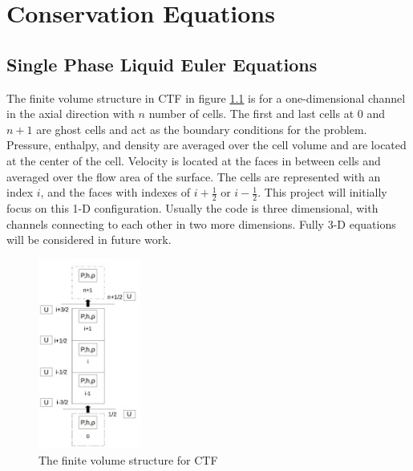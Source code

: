 \vspace*{-80mm}
\chapter{Conservation Equations} \label{chapter2:conservation_equations}
	
	
\section{Single Phase Liquid Euler Equations} \label{sec:euler_equations}
	
	The finite volume structure in CTF in figure \ref{fig:CTF-Cells} is for
	a one-dimensional channel in the axial direction with $n$ number of cells.
	The first and last cells at $0$ and $n+1$ are ghost cells and act as the
	boundary conditions for the problem. Pressure, enthalpy, and density are
	averaged over the cell volume and are located at the center of the cell.
	Velocity is located at the faces in between cells and averaged over the flow
	area of the surface. The cells are represented with an index $i$, and the
	faces with indexes of $i+\frac{1}{2}$ or $i-\frac{1}{2}$. This project will
	initially focus on this 1-D configuration. Usually the code is three
	dimensional, with channels connecting to each other in two more dimensions.
	Fully 3-D equations will be considered in future work.
	
	\begin{figure}[!h]
		\centering
		\includegraphics[width=0.30\textwidth]{images/CTF-Cells}
		\caption{The finite volume structure for CTF}
		\label{fig:CTF-Cells}
	\end{figure}

